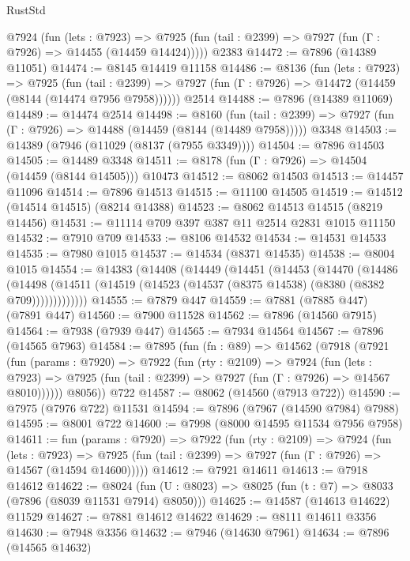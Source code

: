 \begin{lexlean}{RustStd}
\begin{coremodule}
    @7924
      (fun (lets : @7923) =>
      @7925 (fun (tail : @2399) => @7927 (fun (Γ : @7926) => @14455 (@14459 @14424)))))
    @2383
@14472 := @7896 (@14389 @11051)
@14474 := @8145 @14419 @11158
@14486 := @8136
    (fun (lets : @7923) =>
    @7925
      (fun (tail : @2399) =>
      @7927 (fun (Γ : @7926) => @14472 (@14459 (@8144 (@14474 @7956 @7958))))))
    @2514
@14488 := @7896 (@14389 @11069)
@14489 := @14474 @2514
@14498 := @8160
    (fun (tail : @2399) => @7927 (fun (Γ : @7926) => @14488 (@14459 (@8144 (@14489 @7958)))))
    @3348
@14503 := @14389 (@7946 (@11029 (@8137 (@7955 @3349))))
@14504 := @7896 @14503
@14505 := @14489 @3348
@14511 := @8178 (fun (Γ : @7926) => @14504 (@14459 (@8144 @14505))) @10473
@14512 := @8062 @14503
@14513 := @14457 @11096
@14514 := @7896 @14513
@14515 := @11100 @14505
@14519 := @14512 (@14514 @14515) (@8214 @14388)
@14523 := @8062 @14513 @14515 (@8219 @14456)
@14531 := @11114 @709 @397 @387 @11 @2514 @2831 @1015 @11150
@14532 := @7910 @709
@14533 := @8106 @14532
@14534 := @14531 @14533
@14535 := @7980 @1015
@14537 := @14534 (@8371 @14535)
@14538 := @8004 @1015
@14554 := @14383
    (@14408
      (@14449
        (@14451
          (@14453
            (@14470
              (@14486
                (@14498
                  (@14511 (@14519 (@14523 (@14537 (@8375 @14538) (@8380 (@8382 @709)))))))))))))
@14555 := @7879 @447
@14559 := @7881 (@7885 @447) (@7891 @447)
@14560 := @7900 @11528
@14562 := @7896 (@14560 @7915)
@14564 := @7938 (@7939 @447)
@14565 := @7934 @14564
@14567 := @7896 (@14565 @7963)
@14584 := @7895
    (fun (fn : @89) =>
    @14562
      (@7918
        (@7921
          (fun (params : @7920) =>
          @7922
            (fun (rty : @2109) =>
            @7924
              (fun (lets : @7923) =>
              @7925 (fun (tail : @2399) => @7927 (fun (Γ : @7926) => @14567 @8010))))))
        @8056))
    @722
@14587 := @8062 (@14560 (@7913 @722))
@14590 := @7975 (@7976 @722) @11531
@14594 := @7896 (@7967 (@14590 @7984) @7988)
@14595 := @8001 @722
@14600 := @7998 (@8000 @14595 @11534 @7956 @7958)
@14611 := fun (params : @7920) =>
  @7922
    (fun (rty : @2109) =>
    @7924
      (fun (lets : @7923) =>
      @7925 (fun (tail : @2399) => @7927 (fun (Γ : @7926) => @14567 (@14594 @14600)))))
@14612 := @7921 @14611
@14613 := @7918 @14612
@14622 := @8024
    (fun (U : @8023) => @8025 (fun (t : @7) => @8033 (@7896 (@8039 @11531 @7914) @8050)))
@14625 := @14587 (@14613 @14622) @11529
@14627 := @7881 @14612 @14622
@14629 := @8111 @14611 @3356
@14630 := @7948 @3356
@14632 := @7946 (@14630 @7961)
@14634 := @7896 (@14565 @14632)

\end{coremodule}
\end{lexlean}
